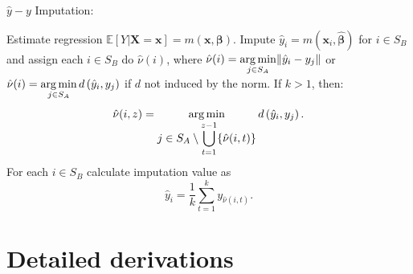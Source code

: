 \documentclass[
]{jss}
\begin{document}
\begin{algorithm}[ht!]
\caption{$\hat{y}-y$ Imputation:}
\label{algo-4}
\begin{algorithmic}[1]
\State Estimate regression $\mathbb{E}[Y|\boldsymbol{X}=\boldsymbol{x}]=m(\boldsymbol{x}, \boldsymbol{\beta})$.\;
\State Impute $\hat{y}_{i}=m\left(\boldsymbol{x}_{i},\hat{\boldsymbol{\beta}}\right)$ 
for $i \in S_{B}$ and assign each 
$i \in S_{B}$ do $\hat{\nu}(i)$, where
$\displaystyle \hat{\nu}(i)=
\operatornamewithlimits{arg\,min}_{j \in S_{A}}\lVert \hat{y}_{i}-y_{j}\rVert$ or
$\displaystyle \hat{\nu}(i)=
\operatornamewithlimits{arg\,min}_{j \in S_{A}}d\left(\hat{y}_{i},y_{j}\right)$ 
if $d$ not induced by the norm.\;
\State If $k>1$, then:
$$\hat{\nu}(i, z) = \operatornamewithlimits{arg\,min}_{\displaystyle j \in S_{A} \setminus \bigcup_{t=1}^{z-1}
\{\hat{\nu}(i, t)\}}
d\left(\hat{y}_{i},y_{j}\right).$$
\State For each $i \in S_B$ calculate imputation value as
$$
\hat{y}_i = \frac{1}{k}\sum_{t=1}^{k}y_{\hat{\nu}(i, t)}.
$$
\end{algorithmic}
\end{algorithm}

\section{Detailed derivations}\label{sec-derivations}
\end{document}
